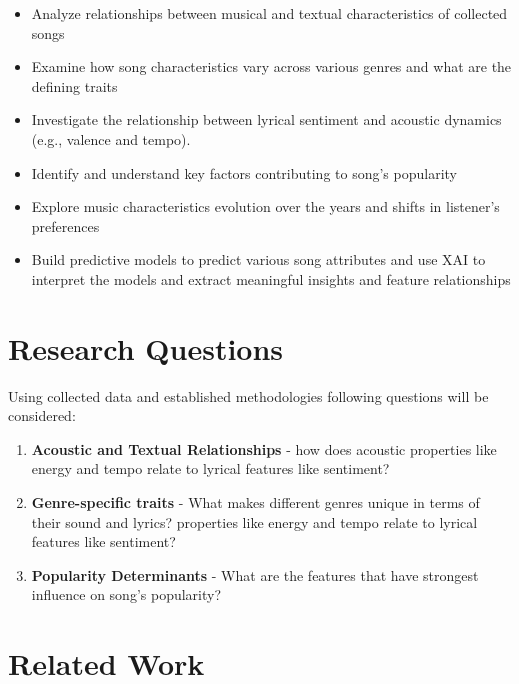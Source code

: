 \begin{itemize} 
  \item Analyze relationships between musical and textual characteristics of
    collected songs
  \item Examine how song characteristics vary across various genres and what are the defining traits
  \item Investigate the relationship between lyrical sentiment and acoustic
    dynamics (e.g., valence and tempo).
  \item Identify and understand key factors contributing to song's popularity
  \item Explore music characteristics evolution over the years and shifts in listener's preferences
  \item Build predictive models to predict various song attributes and use XAI
    to interpret the models and extract meaningful insights and feature
    relationships
\end{itemize}


\section{Research Questions}
\label{sec:researchquestions}
Using collected data and established methodologies following questions will be
considered:

\begin{enumerate}
  \item \textbf{Acoustic and Textual Relationships} - how does acoustic
    properties like energy and tempo relate to lyrical features like sentiment?
  \item \textbf{Genre-specific traits} - What makes different genres unique in terms of their sound and lyrics?
    properties like energy and tempo relate to lyrical features like sentiment?
  \item \textbf{Popularity Determinants} - What are the features that have
    strongest influence on song's popularity?
\end{enumerate}


\section{Related Work}
\label{sec:relatedwork}


